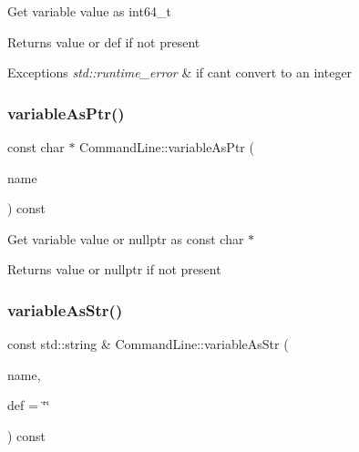 Get variable value as int64\+\_\+t \begin{DoxyReturn}{Returns}
value or def if not present 
\end{DoxyReturn}

\begin{DoxyExceptions}{Exceptions}
{\em std\+::runtime\+\_\+error} & if can\textquotesingle{}t convert to an integer \\
\hline
\end{DoxyExceptions}
\mbox{\label{classtheoria_1_1util_1_1CommandLine_a26dab1188ed94478a4eaaf1b9e1ed19e}} 
\subsubsection{\texorpdfstring{variable\+As\+Ptr()}{variableAsPtr()}}
{\footnotesize\ttfamily const char $\ast$ Command\+Line\+::variable\+As\+Ptr (\begin{DoxyParamCaption}\item[{const std\+::string \&}]{name }\end{DoxyParamCaption}) const\hspace{0.3cm}{\ttfamily [noexcept]}}

Get variable value or nullptr as const char $\ast$ \begin{DoxyReturn}{Returns}
value or nullptr if not present 
\end{DoxyReturn}
\mbox{\label{classtheoria_1_1util_1_1CommandLine_aa9310fbfe3b1397bb9288eee7aae4abc}} 
\subsubsection{\texorpdfstring{variable\+As\+Str()}{variableAsStr()}}
{\footnotesize\ttfamily const std\+::string \& Command\+Line\+::variable\+As\+Str (\begin{DoxyParamCaption}\item[{const std\+::string \&}]{name,  }\item[{const std\+::string \&}]{def = {\ttfamily \char`\"{}\char`\"{}} }\end{DoxyParamCaption}) const}

